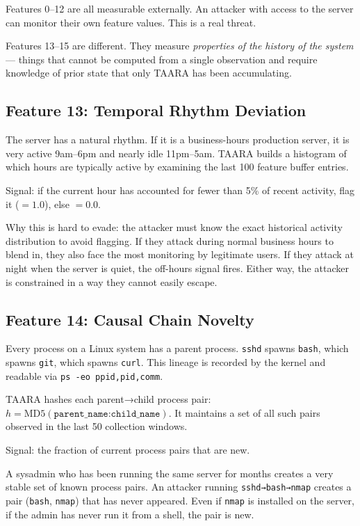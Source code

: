 \documentclass[11pt,a4paper]{article}
\begin{document}
Features 0–12 are all measurable externally. An attacker with access to the server can monitor their own feature values. This is a real threat.

Features 13–15 are different. They measure \textit{properties of the history of the system} — things that cannot be computed from a single observation and require knowledge of prior state that only TAARA has been accumulating.

\subsection{Feature 13: Temporal Rhythm Deviation}

The server has a natural rhythm. If it is a business-hours production server, it is very active 9am–6pm and nearly idle 11pm–5am. TAARA builds a histogram of which hours are typically active by examining the last 100 feature buffer entries.

Signal: if the current hour has accounted for fewer than 5\% of recent activity, flag it ($= 1.0$), else $= 0.0$.

Why this is hard to evade: the attacker must know the exact historical activity distribution to avoid flagging. If they attack during normal business hours to blend in, they also face the most monitoring by legitimate users. If they attack at night when the server is quiet, the off-hours signal fires. Either way, the attacker is constrained in a way they cannot easily escape.

\subsection{Feature 14: Causal Chain Novelty}

Every process on a Linux system has a parent process. \texttt{sshd} spawns \texttt{bash}, which spawns \texttt{git}, which spawns \texttt{curl}. This lineage is recorded by the kernel and readable via \texttt{ps -eo ppid,pid,comm}.

TAARA hashes each parent→child process pair: $h = \text{MD5}(\texttt{parent\_name:child\_name})$. It maintains a set of all such pairs observed in the last 50 collection windows.

Signal: the fraction of current process pairs that are new.

A sysadmin who has been running the same server for months creates a very stable set of known process pairs. An attacker running \texttt{sshd→bash→nmap} creates a pair (\texttt{bash}, \texttt{nmap}) that has never appeared. Even if \texttt{nmap} is installed on the server, if the admin has never run it from a shell, the pair is new.
\end{document}
